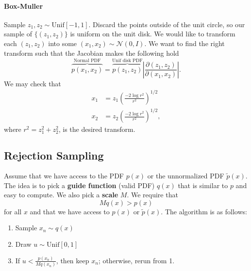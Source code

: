 \documentclass{article}
\begin{document}
\paragraph{Box-Muller} Sample $z_1,z_2 \sim \text{Unif}[-1,1]$. Discard the points outside of the unit circle, so our sample of $\{(z_1,z_2)\}$ is uniform on the unit disk. We would like to transform each $(z_1,z_2)$ into some $(x_1,x_2) \sim \mathcal N(0,I)$. We want to find the right transform such that the Jacobian makes the following hold \[
\overbrace{p(x_1,x_2)}^{\text{Normal PDF}} = \overbrace{p(z_1,z_2)}^{\text{Unif disk PDF}} \left|\frac{\partial(z_1,z_2)}{\partial(x_1,x_2)}\right|.
\]
We may check that \begin{align*}
x_1 &= z_1 \left({\frac{-2\log r^2}{r^2}}\right)^{1/2}\\
x_2 &= z_2 \left({\frac{-2\log r^2}{r^2}}\right)^{1/2},
\end{align*}
where $r^2 = z_1^2 + z_2^2$, is the desired transform.









\subsection{Rejection Sampling}
Assume that we have access to the PDF $p(x)$ or the unnormalized PDF $\tilde p(x)$. The idea is to pick a \textbf{guide function} (valid PDF) $q(x)$ that is similar to $p$ and easy to compute. We also pick a \textbf{scale} $M$. We require that \[
Mq(x) > p(x)
\]
for all $x$ and that we have access to $p(x)$ or $\widetilde{p}(x)$. The algorithm is as follows:
\begin{enumerate}
\item  Sample $x_n \sim q(x)$
\item  Draw $u \sim \text{Unif}[0,1]$
\item  If $u < \frac{p(x_n)}{Mq(x_n)}$, then keep $x_n$; otherwise, rerun from 1.
\end{enumerate}
\end{document}
